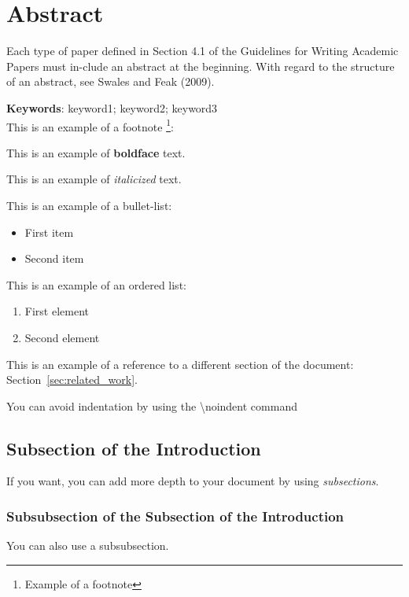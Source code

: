 


\section*{Abstract}
\label{abstract}


Each type of paper defined in Section 4.1 of the Guidelines for Writing Academic Papers must in-clude an abstract at the beginning. With regard to the structure of an abstract, see Swales and Feak (2009).





\noindent \textbf{Keywords}: keyword1; keyword2; keyword3 \\



This is an example of a footnote \footnote{Example of a footnote}:

This is an example of \textbf{boldface} text.

This is an example of \textit{italicized} text.

This is an example of a bullet-list:
\begin{itemize}
    \item First item
    \item Second item
\end{itemize}

This is an example of an ordered list:
\begin{enumerate}
    \item First element
    \item Second element
\end{enumerate}

This is an example of a reference to a different section of the document: Section~\ref{sec:related_work}.

\noindent You can avoid indentation by using the \textbackslash noindent command

\subsection{Subsection of the Introduction}
\label{subsec:introduction}
If you want, you can add more depth to your document by using \textit{subsections}.

\subsubsection{Subsubsection of the Subsection of the Introduction}
\label{subsubsec:}
You can also use a subsubsection. \\


